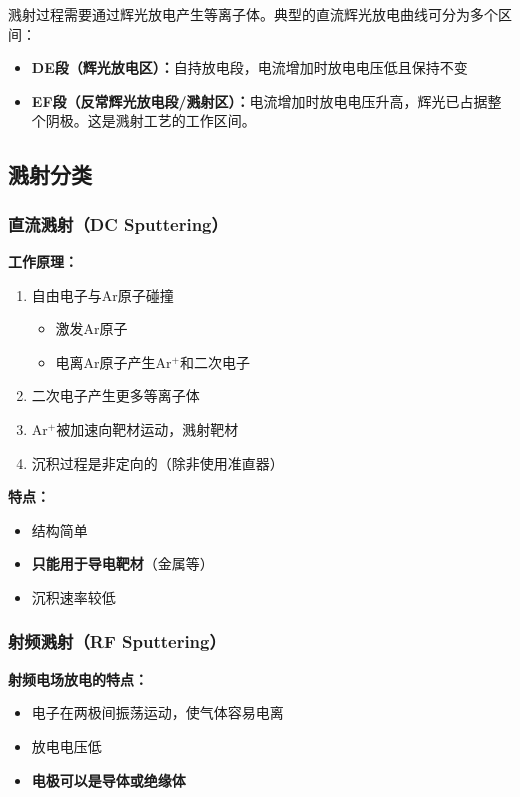 \documentclass[UTF8,12pt,a4paper]{ctexart}
\begin{document}
溅射过程需要通过辉光放电产生等离子体。典型的直流辉光放电曲线可分为多个区间：

\begin{itemize}
    \item \textbf{DE段（辉光放电区）：}自持放电段，电流增加时放电电压低且保持不变
    \item \textbf{EF段（反常辉光放电段/溅射区）：}电流增加时放电电压升高，辉光已占据整个阴极。这是溅射工艺的工作区间。
\end{itemize}

\subsection{溅射分类}

\subsubsection{直流溅射（DC Sputtering）}

\textbf{工作原理：}
\begin{enumerate}
    \item 自由电子与Ar原子碰撞
    \begin{itemize}
        \item 激发Ar原子
        \item 电离Ar原子产生Ar$^+$和二次电子
    \end{itemize}
    \item 二次电子产生更多等离子体
    \item Ar$^+$被加速向靶材运动，溅射靶材
    \item 沉积过程是非定向的（除非使用准直器）
\end{enumerate}

\textbf{特点：}
\begin{itemize}
    \item 结构简单
    \item \textbf{只能用于导电靶材}（金属等）
    \item 沉积速率较低
\end{itemize}

\subsubsection{射频溅射（RF Sputtering）}

\textbf{射频电场放电的特点：}
\begin{itemize}
    \item 电子在两极间振荡运动，使气体容易电离
    \item 放电电压低
    \item \textbf{电极可以是导体或绝缘体}
\end{itemize}
\end{document}
